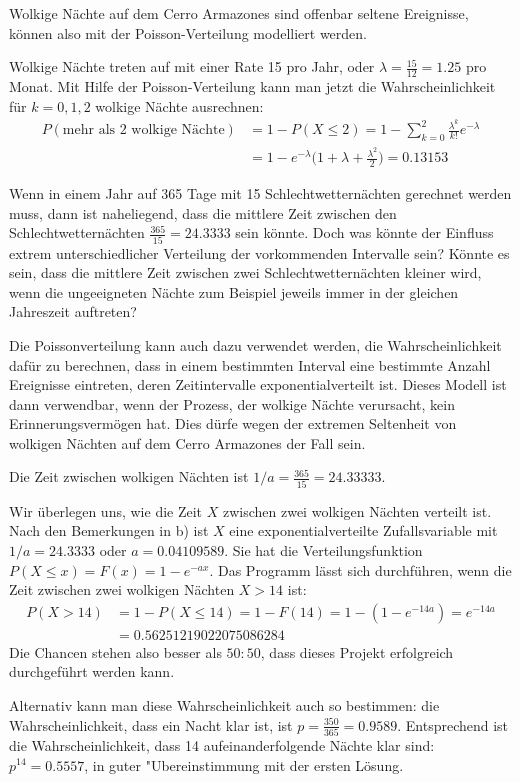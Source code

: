 \begin{loesung}
Wolkige Nächte auf dem Cerro Armazones sind offenbar seltene
Ereignisse, können also mit der Poisson-Verteilung modelliert
werden.
\begin{teilaufgaben}
\item Wolkige Nächte treten auf mit einer Rate 15 pro Jahr, oder
$\lambda=\frac{15}{12}=1.25$ pro Monat. Mit Hilfe der Poisson-Verteilung
kann man jetzt die Wahrscheinlichkeit für $k=0,1,2$ wolkige Nächte
ausrechnen:
\begin{align*}
P(\text{mehr als 2 wolkige Nächte})
&=1-P(X\le 2)
=
1-\sum_{k=0}^2\frac{\lambda^k}{k!}e^{-\lambda}
\\
&=1-e^{-\lambda}\biggl(1+\lambda+\frac{\lambda^2}2\biggr)
=0.13153
\end{align*}
\item 
Wenn in einem Jahr auf 365 Tage mit 15 Schlechtwetternächten gerechnet
werden muss, dann ist naheliegend, dass die  mittlere Zeit zwischen
den Schlechtwetternächten $\frac{365}{15}=24.3333$ sein könnte.
Doch was könnte der Einfluss extrem unterschiedlicher Verteilung
der vorkommenden Intervalle sein? Könnte es sein, dass die mittlere
Zeit zwischen zwei Schlechtwetternächten kleiner wird, wenn die
ungeeigneten Nächte zum Beispiel jeweils immer in der gleichen Jahreszeit
auftreten?

Die Poissonverteilung kann auch dazu verwendet werden, die Wahrscheinlichkeit
dafür zu berechnen, dass in einem bestimmten Interval eine bestimmte
Anzahl Ereignisse eintreten, deren Zeitintervalle exponentialverteilt ist.
Dieses Modell ist dann verwendbar, wenn der Prozess, der wolkige Nächte
verursacht, kein Erinnerungsvermögen hat. Dies dürfe wegen der extremen
Seltenheit von wolkigen Nächten auf dem Cerro Armazones der Fall sein.

Die Zeit zwischen wolkigen Nächten ist $1/a=\frac{365}{15}=24.33333$.
\item
Wir überlegen uns, wie
die Zeit $X$ zwischen zwei wolkigen Nächten verteilt ist. Nach den Bemerkungen
in b) ist $X$ eine exponentialverteilte Zufallsvariable mit $1/a=24.3333$
oder $a=0.04109589$.
Sie hat die Verteilungsfunktion
$
P(X\le x)=
F(x)=1-e^{-ax}.
$
Das Programm lässt sich durchführen, wenn die Zeit zwischen zwei
wolkigen Nächten $X> 14$ ist:
\begin{align*}
P(X> 14)&=1-P(X\le 14)=1-F(14)=1-(1-e^{-14a})=e^{-14a}
\\
&= 0.56251219022075086284
\end{align*}
Die Chancen stehen also besser als $50:50$, dass dieses Projekt
erfolgreich durchgeführt werden kann.

Alternativ kann man diese Wahrscheinlichkeit auch so bestimmen:
die Wahrscheinlichkeit, dass ein Nacht klar ist, ist $p=\frac{350}{365}=0.9589$.
Entsprechend ist die Wahrscheinlichkeit, dass 14 aufeinanderfolgende
Nächte klar sind: $p^{14}=0.5557$, in guter "Ubereinstimmung mit der
ersten Lösung.
\qedhere
\end{teilaufgaben}
\end{loesung}

